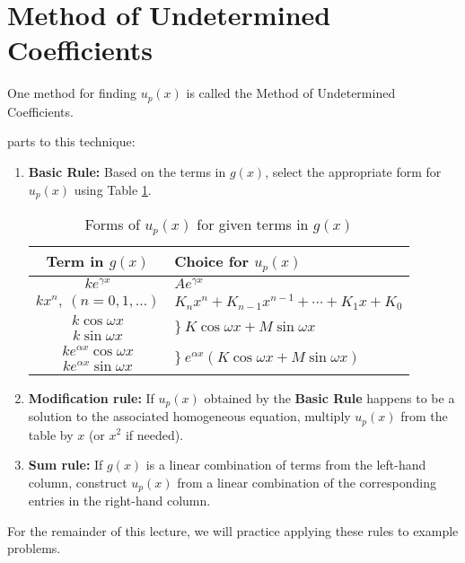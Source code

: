 \section{Method of Undetermined Coefficients}
One method for finding $u_p(x)$ is called the Method of Undetermined Coefficients.

 parts to this technique:

\begin{enumerate}
\item \textbf{Basic Rule:} Based on the terms in $g(x)$, select the appropriate form for $u_p(x)$ using Table \ref{tab:method-of-guessing-table}.

\begin{table}[h]
\begin{center}
\begin{tabular}{|c|l|}
\hline
Term in $g(x)$ & Choice for $u_p(x)$ \\\hline%

$ke^{\gamma x}$ & $Ae^{\gamma x}$ \\\hline
$kx^{n}, \ (n=0,1,\dots)$ & $K_nx^n+K_{n-1}x^{n-1}+\cdots +K_1x+K_0$\\\hline
$k \cos{\omega x}$ & \multirow{2}{*}{$\Big\} \ K\cos{\omega x} + M\sin{\omega x}$}\\\cline{1-1}
$k \sin{\omega x}$ &                 \\\hline
$ke^{\alpha x}\cos{\omega x}$   & \multirow{2}{*}{$\Big\} \ e^{\alpha x}\left(K\cos{\omega x} + M\sin{\omega x}\right)$}\\\cline{1-1} 
$ke^{\alpha x}\sin{\omega x}$ &      \\\hline
\end{tabular}
\end{center}
\caption{Forms of $u_p(x)$ for given terms in $g(x)$}
\label{tab:method-of-guessing-table}
\end{table}

\item \textbf{Modification rule:} If $u_p(x)$ obtained by the \textbf{Basic Rule} happens to be a solution to the associated homogeneous equation, multiply $u_p(x)$ from the table by $x$ (or $x^2$ if needed).

\item \textbf{Sum rule:} If $g(x)$ is a linear combination of terms from the left-hand column, construct $u_p(x)$ from a linear combination of the corresponding entries in the right-hand column.
\end{enumerate}
For the remainder of this lecture, we will practice applying these rules to example problems.

